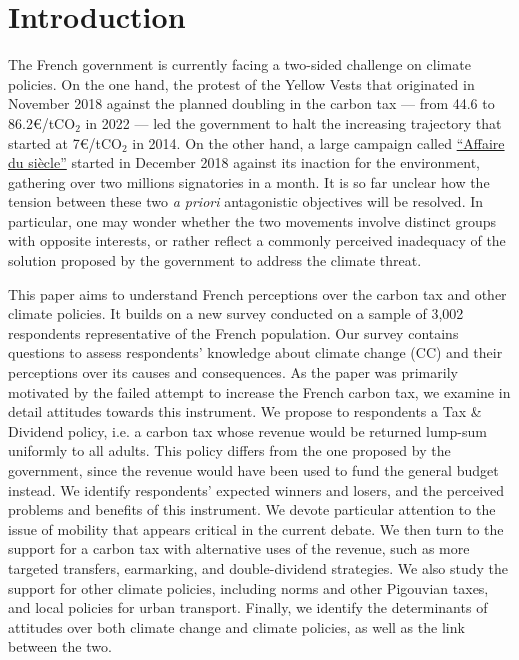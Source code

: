 \documentclass[english,5p,authoryear]{elsarticle}
\begin{document}
\setcounter{tocdepth}{2}

\vfill\eject 

\section{Introduction}

The French government is currently facing a two-sided challenge on climate policies. On the one hand, the protest of the Yellow Vests that originated in November 2018 against the planned doubling in the carbon tax  --- from 44.6 to 86.2\euro{}/tCO$_2$ in 2022 --- led the government to halt the increasing trajectory that started at 7\euro{}/tCO$_2$ in 2014. On the other hand, a large campaign called \href{https://laffairedusiecle.net/}{``Affaire du siècle''} started in December 2018 against its inaction for the environment, gathering over two millions signatories in a month. It is so far unclear how the tension between these two \textit{a priori} antagonistic objectives will be resolved. In particular, one may wonder whether the two movements involve distinct groups with opposite interests, or rather reflect a commonly perceived inadequacy of the solution proposed by the government to address the climate threat.


This paper aims to understand French perceptions over the carbon tax and other climate policies. It builds on a new survey conducted on a sample of 3,002 respondents representative of the French population. Our survey contains questions to assess respondents' knowledge about climate change (CC) and their perceptions over its causes and consequences. As the paper was primarily motivated by the failed attempt to increase the French carbon tax, we examine in detail attitudes towards this instrument. We propose to respondents a Tax \& Dividend policy, i.e. a carbon tax whose revenue would be returned lump-sum uniformly to all adults. This policy differs from the one proposed by the government, since the revenue would have been used to fund the general budget instead. We identify respondents' expected winners and losers, and the perceived problems and benefits of this instrument. We devote particular attention to the issue of mobility that appears critical in the current debate. We then turn to the support for a carbon tax with alternative uses of the revenue, such as more targeted transfers, earmarking, and double-dividend strategies. We also study the support for other climate policies, including norms and other Pigouvian taxes, and local policies for urban transport. Finally, we identify the determinants of attitudes over both climate change and climate policies, as well as the link between the two.
\end{document}
